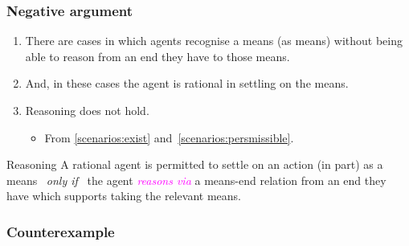 \documentclass[noamssymb,
graphics,
]{beamer} %
\newcommand{\schemaName}[1]{\textsf{#1}}
\newcommand{\hozlinedash}[0]{
  \noindent\hdashrule[0.5ex][c]{\textwidth}{.1pt}{2.5pt}
}
\begin{document}
\begin{frame}
  \frametitle{Negative argument}

  {%
  \begin{enumerate}
  \item\label{scenarios:exist} There are cases in which agents recognise a means (as means) without being able to reason from an end they have to those means.
  \item\label{scenarios:persmissible} And, in these cases the agent is rational in settling on the means.

  \item \schemaName{Reasoning} does not hold.
    \begin{itemize}
    \item From \ref{scenarios:exist} and~\ref{scenarios:persmissible}.
    \end{itemize}
  \end{enumerate}
  }

  \hozlinedash
  {\footnotesize
    \begin{block}{Reasoning}
      A rational agent is permitted to settle on an action (in part) as a means
      \newline
      \mbox{ }\hfill\emph{only if}\hfill\mbox{ }
      \newline
      the agent \textcolor{fuchsia}{\emph{reasons via}}  a means-end relation from an end they have which supports taking the relevant means.
    \end{block}
  }
\end{frame}

\subsubsection{Counterexample}
\label{sec:counterexample}
\end{document}
